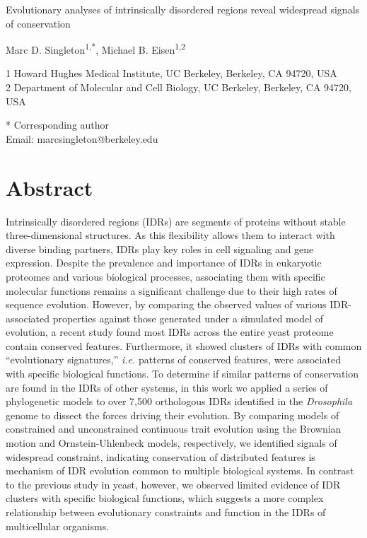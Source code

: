 Evolutionary analyses of intrinsically disordered regions reveal widespread signals of conservation

Marc D. Singleton\textsuperscript{1,*}, Michael B. Eisen\textsuperscript{1,2}

1 Howard Hughes Medical Institute, UC Berkeley, Berkeley, CA 94720, USA\\
2 Department of Molecular and Cell Biology, UC Berkeley, Berkeley, CA 94720, USA

* Corresponding author\\
Email: marcsingleton@berkeley.edu

\clearpage

\section{Abstract}
Intrinsically disordered regions (IDRs) are segments of proteins without stable three-dimensional structures. As this flexibility allows them to interact with diverse binding partners, IDRs play key roles in cell signaling and gene expression. Despite the prevalence and importance of IDRs in eukaryotic proteomes and various biological processes, associating them with specific molecular functions remains a significant challenge due to their high rates of sequence evolution. However, by comparing the observed values of various IDR-associated properties against those generated under a simulated model of evolution, a recent study found most IDRs across the entire yeast proteome contain conserved features. Furthermore, it showed clusters of IDRs with common ``evolutionary signatures,'' \textit{i.e.} patterns of conserved features, were associated with specific biological functions. To determine if similar patterns of conservation are found in the IDRs of other systems, in this work we applied a series of phylogenetic models to over 7,500 orthologous IDRs identified in the \textit{Drosophila} genome to dissect the forces driving their evolution. By comparing models of constrained and unconstrained continuous trait evolution using the Brownian motion and Ornstein-Uhlenbeck models, respectively, we identified signals of widespread constraint, indicating conservation of distributed features is mechanism of IDR evolution common to multiple biological systems. In contrast to the previous study in yeast, however, we observed limited evidence of IDR clusters with specific biological functions, which suggests a more complex relationship between evolutionary constraints and function in the IDRs of multicellular organisms.

